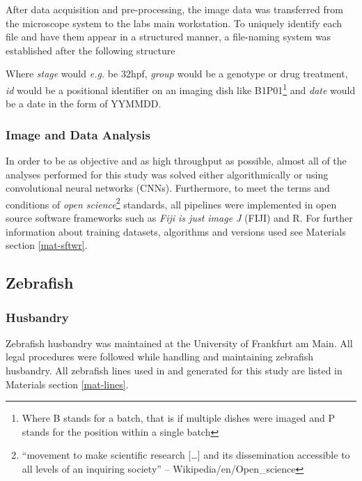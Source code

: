 \documentclass[11pt,singlespacinge,twoside]{reedthesis} %
\theoremstyle{definition}
\theoremstyle{definition}
\theoremstyle{definition}
\theoremstyle{remark}
\begin{document}
After data acquisition and pre-processing, the image data was transferred from the microscope system to the labs main workstation. To uniquely identify each file and have them appear in a structured manner, a file-naming system was established after the following structure

\makebox[\linewidth]{$[stage]\_[group]\_[id]\_[date]$}
\newline

Where \emph{stage} would \emph{e.g.} be 32hpf, \emph{group} would be a genotype or drug treatment, \emph{id} would be a positional identifier on an imaging dish like B1P01\footnote{Where B stands for a batch, that is if multiple dishes were imaged and P stands for the position within a single batch} and \emph{date} would be a date in the form of YYMMDD.

\hypertarget{image-and-data-analysis}{%
\subsubsection{Image and Data Analysis}\label{image-and-data-analysis}}

In order to be as objective and as high throughput as possible, almost all of the analyses performed for this study was solved either algorithmically or using convolutional neural networks (CNNs). Furthermore, to meet the terms and conditions of \emph{open science}\footnote{``movement to make scientific research {[}\ldots{]} and its dissemination accessible to all levels of an inquiring society'' -- Wikipedia/en/Open\_science} standards, all pipelines were implemented in open source software frameworks such as \emph{Fiji is just image J} (FIJI) and R. For further information about training datasets, algorithms and versions used see Materials section \ref{mat-sftwr}.

\hypertarget{Zeb-met}{%
\subsection{Zebrafish}\label{Zeb-met}}

\hypertarget{husbandry}{%
\subsubsection{Husbandry}\label{husbandry}}

Zebraﬁsh husbandry was maintained at the University of Frankfurt am Main. All legal procedures were followed while handling and maintaining zebraﬁsh husbandry. All zebraﬁsh lines used in and generated for this study are listed in Materials section \ref{mat-lines}.
\end{document}
